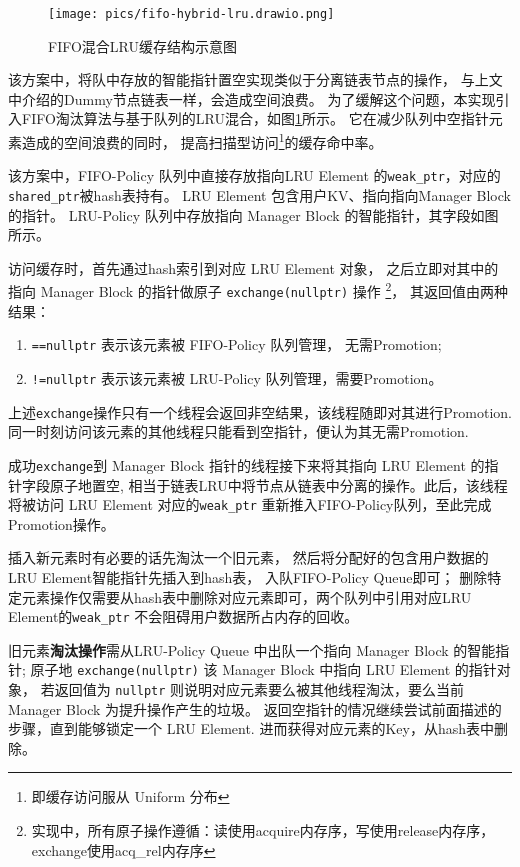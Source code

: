\begin{figure}
    \centering
    \texttt{[image: pics/fifo-hybrid-lru.drawio.png]}
    \caption{FIFO混合LRU缓存结构示意图}
    \label{fig:fifo-h}
\end{figure}

该方案中，将队中存放的智能指针置空实现类似于分离链表节点的操作，
与上文中介绍的Dummy节点链表一样，会造成空间浪费。
为了缓解这个问题，本实现引入FIFO淘汰算法与基于队列的LRU混合，如图\ref{fig:fifo-h}所示。
它在减少队列中空指针元素造成的空间浪费的同时，
提高扫描型访问\footnote{即缓存访问服从 Uniform 分布}的缓存命中率。

该方案中，FIFO-Policy 队列中直接存放指向LRU Element 的\verb|weak_ptr|，对应的\verb|shared_ptr|被hash表持有。
LRU Element 包含用户KV、指向指向Manager Block 的指针。
LRU-Policy 队列中存放指向 Manager Block 的智能指针，其字段如图所示。

访问缓存时，首先通过hash索引到对应 LRU Element 对象，
之后立即对其中的指向 Manager Block 的指针做原子 \verb|exchange(nullptr)| 操作
\footnote{实现中，所有原子操作遵循：读使用acquire内存序，写使用release内存序，exchange使用acq\_rel内存序}，
其返回值由两种结果：
\begin{enumerate}
    \item \verb|==nullptr| 表示该元素被 FIFO-Policy 队列管理， 无需Promotion;
    \item \verb|!=nullptr| 表示该元素被 LRU-Policy 队列管理，需要Promotion。
\end{enumerate}
上述\verb|exchange|操作只有一个线程会返回非空结果，该线程随即对其进行Promotion.
同一时刻访问该元素的其他线程只能看到空指针，便认为其无需Promotion.

成功\verb|exchange|到 Manager Block 指针的线程接下来将其指向 LRU Element 的指针字段原子地置空,
相当于链表LRU中将节点从链表中分离的操作。此后，该线程将被访问 LRU Element 对应的\verb|weak_ptr|
重新推入FIFO-Policy队列，至此完成Promotion操作。

插入新元素时有必要的话先淘汰一个旧元素，
然后将分配好的包含用户数据的LRU Element智能指针先插入到hash表，
入队FIFO-Policy Queue即可；
删除特定元素操作仅需要从hash表中删除对应元素即可，两个队列中引用对应LRU Element的\verb|weak_ptr|
不会阻碍用户数据所占内存的回收。

旧元素\textbf{淘汰操作}需从LRU-Policy Queue 中出队一个指向 Manager Block 的智能指针;
原子地 \verb|exchange(nullptr)| 该 Manager Block 中指向 LRU Element 的指针对象，
若返回值为 \verb|nullptr| 则说明对应元素要么被其他线程淘汰，要么当前 Manager Block 为提升操作产生的垃圾。
返回空指针的情况继续尝试前面描述的步骤，直到能够锁定一个 LRU Element.
进而获得对应元素的Key，从hash表中删除。

